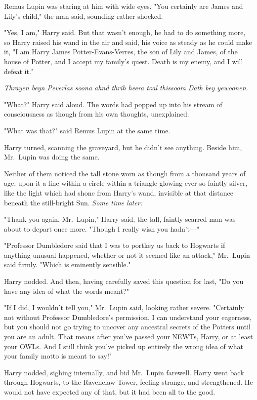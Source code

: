 Remus Lupin was staring at him with wide eyes. "You certainly are James and 
Lily's child," the man said, sounding rather shocked.

"Yes, I am," Harry said. But that wasn't enough, he had to do something more, 
so Harry raised his wand in the air and said, his voice as steady as he could 
make it, "I am Harry James Potter-Evans-Verres, the son of Lily and James, of 
the house of Potter, and I accept my family's quest. Death is my enemy, and I 
will defeat it."

\emph{Thrayen beyn Peverlas soona ahnd thrih heera toal thissoom Dath bey 
yewoonen.}

"What?" Harry said aloud. The words had popped up into his stream of 
consciousness as though from his own thoughts, unexplained.

"What was that?" said Remus Lupin at the same time.

Harry turned, scanning the graveyard, but he didn't see anything. Beside him, 
Mr.~Lupin was doing the same.

Neither of them noticed the tall stone worn as though from a thousand years of 
age, upon it a line within a circle within a triangle glowing ever so faintly 
silver, like the light which had shone from Harry's wand, invisible at that 
distance beneath the still-bright Sun.
\sbreak
\emph{Some time later:}

"Thank you again, Mr.~Lupin," Harry said, the tall, faintly scarred man was 
about to depart once more. "Though I really wish you hadn't---"

"Professor Dumbledore said that I was to portkey us back to Hogwarts if 
anything unusual happened, whether or not it seemed like an attack," Mr.~Lupin 
said firmly. "Which is eminently sensible."

Harry nodded. And then, having carefully saved this question for last, "Do you 
have any idea of what the words meant?"

"If I did, I wouldn't tell you," Mr.~Lupin said, looking rather severe. 
"Certainly not without Professor Dumbledore's permission. I can understand your 
eagerness, but you should not go trying to uncover any ancestral secrets of the 
Potters until you are an adult. That means after you've passed your NEWTs, 
Harry, or at least your OWLs. And I still think you've picked up entirely the 
wrong idea of what your family motto is meant to say!"

Harry nodded, sighing internally, and bid Mr.~Lupin farewell.
\sbreak
Harry went back through Hogwarts, to the Ravenclaw Tower, feeling strange, and 
strengthened. He would not have expected any of that, but it had been all to 
the good.

